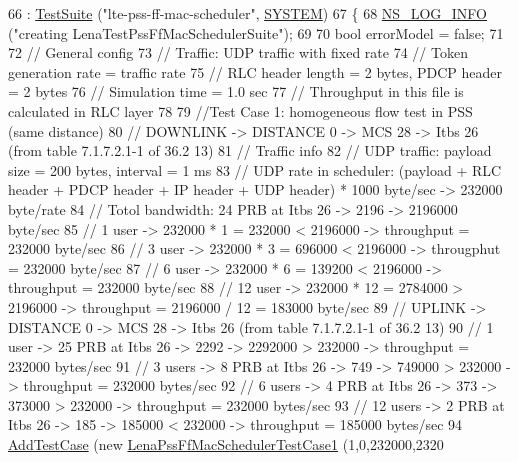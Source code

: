 \begin{DoxyCode}
66   : \hyperlink{classns3_1_1TestSuite_a904b0c40583b744d30908aeb94636d1a}{TestSuite} (\textcolor{stringliteral}{"lte-pss-ff-mac-scheduler"}, \hyperlink{classns3_1_1TestSuite_a1ebfcab34ec8161e085e8e3a1855eae0a90c5529a26ab3a5ffcc6e57040dbd82e}{SYSTEM})
67 \{
68   \hyperlink{group__logging_gafbd73ee2cf9f26b319f49086d8e860fb}{NS\_LOG\_INFO} (\textcolor{stringliteral}{"creating LenaTestPssFfMacSchedulerSuite"});
69 
70   \textcolor{keywordtype}{bool} errorModel = \textcolor{keyword}{false};
71 
72   \textcolor{comment}{// General config}
73   \textcolor{comment}{// Traffic: UDP traffic with fixed rate}
74   \textcolor{comment}{// Token generation rate = traffic rate}
75   \textcolor{comment}{// RLC header length = 2 bytes, PDCP header = 2 bytes}
76   \textcolor{comment}{// Simulation time = 1.0 sec}
77   \textcolor{comment}{// Throughput in this file is calculated in RLC layer}
78 
79   \textcolor{comment}{//Test Case 1: homogeneous flow test in PSS (same distance)}
80   \textcolor{comment}{// DOWNLINK -> DISTANCE 0 -> MCS 28 -> Itbs 26 (from table 7.1.7.2.1-1 of 36.2    13)}
81   \textcolor{comment}{// Traffic info}
82   \textcolor{comment}{//   UDP traffic: payload size = 200 bytes, interval = 1 ms}
83   \textcolor{comment}{//   UDP rate in scheduler: (payload + RLC header + PDCP header + IP header + UDP header) * 1000 byte/sec
       -> 232000 byte/rate }
84   \textcolor{comment}{// Totol bandwidth: 24 PRB at Itbs 26 -> 2196 -> 2196000 byte/sec}
85   \textcolor{comment}{// 1 user -> 232000 * 1 = 232000 < 2196000 -> throughput = 232000 byte/sec}
86   \textcolor{comment}{// 3 user -> 232000 * 3 = 696000 < 2196000 -> througphut = 232000 byte/sec}
87   \textcolor{comment}{// 6 user -> 232000 * 6 = 139200 < 2196000 -> throughput = 232000 byte/sec}
88   \textcolor{comment}{// 12 user -> 232000 * 12 = 2784000 > 2196000 -> throughput = 2196000 / 12 = 183000 byte/sec}
89   \textcolor{comment}{// UPLINK -> DISTANCE 0 -> MCS 28 -> Itbs 26 (from table 7.1.7.2.1-1 of 36.2    13)}
90   \textcolor{comment}{// 1 user -> 25 PRB at Itbs 26 -> 2292 -> 2292000 > 232000 -> throughput = 232000 bytes/sec}
91   \textcolor{comment}{// 3 users -> 8 PRB at Itbs 26 -> 749 -> 749000 > 232000 -> throughput = 232000 bytes/sec }
92   \textcolor{comment}{// 6 users -> 4 PRB at Itbs 26 -> 373 -> 373000 > 232000 -> throughput = 232000 bytes/sec}
93   \textcolor{comment}{// 12 users -> 2 PRB at Itbs 26 -> 185 -> 185000 < 232000 -> throughput = 185000 bytes/sec}
94   \hyperlink{classns3_1_1TestCase_a3718088e3eefd5d6454569d2e0ddd835}{AddTestCase} (\textcolor{keyword}{new} \hyperlink{classLenaPssFfMacSchedulerTestCase1}{LenaPssFfMacSchedulerTestCase1} (1,0,232000,2320

\end{DoxyCode}
